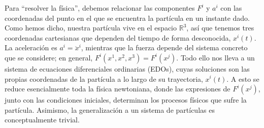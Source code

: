 Para ``resolver la física'', debemos relacionar las componentes \(F^i\) y \(a^i\) con las coordenadas del punto en el que se encuentra la partícula en un instante dado. Como hemos dicho, nuestra partícula vive en el espacio \(\mathbb{R}^3\), así que tenemos tres coordenadas cartesianas que dependen del tiempo de forma desconocida, \(x^i(t)\). La aceleración es \(a^i = \ddot{x}^i\), mientras que la fuerza depende del sistema concreto que se considere; en general, \(F^i(x^1, x^2, x^3)=F^i(x^j)\). Todo ello nos lleva a un sistema de ecuaciones diferenciales ordinarias (EDOs), cuyas soluciones son las propias coordenadas de la partícula a lo largo de su trayectoria, \(x^i(t)\). A esto se reduce esencialmente toda la física newtoniana, donde las expresiones de \(F^i(x^j)\), junto con las condiciones iniciales, determinan los procesos físicos que sufre la partícula. Asimismo, la generalización a un sistema de partículas es conceptualmente trivial.

